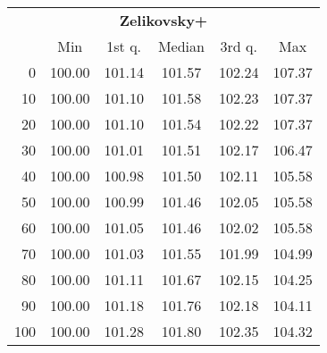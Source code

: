 \begin{tabular}{r|ccccc}
  \multicolumn{6}{c}{{\bf Zelikovsky+}} \\
  & Min & 1st q. & Median & 3rd q. & Max \\ \hline\hline
  0 & 100.00 & 101.14 & 101.57 & 102.24 & 107.37
\\ 10 & 100.00 & 101.10 & 101.58 & 102.23 & 107.37
\\ 20 & 100.00 & 101.10 & 101.54 & 102.22 & 107.37
\\ 30 & 100.00 & 101.01 & 101.51 & 102.17 & 106.47
\\ 40 & 100.00 & 100.98 & 101.50 & 102.11 & 105.58
\\ 50 & 100.00 & 100.99 & 101.46 & 102.05 & 105.58
\\ 60 & 100.00 & 101.05 & 101.46 & 102.02 & 105.58
\\ 70 & 100.00 & 101.03 & 101.55 & 101.99 & 104.99
\\ 80 & 100.00 & 101.11 & 101.67 & 102.15 & 104.25
\\ 90 & 100.00 & 101.18 & 101.76 & 102.18 & 104.11
\\ 100 & 100.00 & 101.28 & 101.80 & 102.35 & 104.32
\end{tabular}
